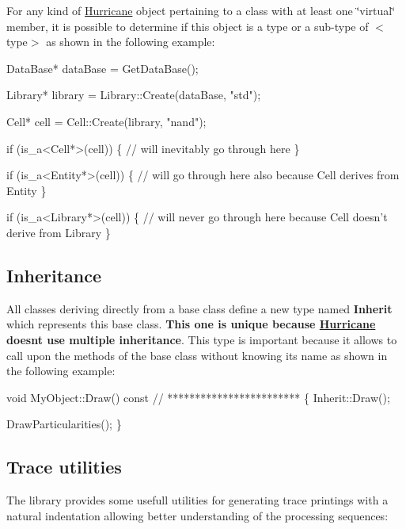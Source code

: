 For any kind of \hyperlink{namespaceHurricane}{Hurricane} object pertaining to a class with at least one \char`\"{}virtual\char`\"{} member, it is possible to determine if this object is a type or a sub-\/type of {\ttfamily $<$type$>$} as shown in the following example\+: 
\begin{DoxyCode}
DataBase* dataBase = GetDataBase();
 
Library* library = Library::Create(dataBase, \textcolor{stringliteral}{"std"});
 
Cell* cell = Cell::Create(library, \textcolor{stringliteral}{"nand"});
 
\textcolor{keywordflow}{if} (is\_a<Cell*>(cell)) \{
   \textcolor{comment}{// will inevitably go through here}
\}
 
\textcolor{keywordflow}{if} (is\_a<Entity*>(cell)) \{
   \textcolor{comment}{// will go through here also because Cell derives from Entity}
\}
 
\textcolor{keywordflow}{if} (is\_a<Library*>(cell)) \{
   \textcolor{comment}{// will never go through here because Cell doesn't derive from Library}
\}
\end{DoxyCode}
\hypertarget{group__Generalities_secGeneralitiesInheritance}{}\subsection{Inheritance}\label{group__Generalities_secGeneralitiesInheritance}
All classes deriving directly from a base class define a new type named {\bfseries Inherit} which represents this base class. {\bfseries This one is unique because \hyperlink{namespaceHurricane}{Hurricane} doesn\textquotesingle{}t use multiple inheritance}. This type is important because it allows to call upon the methods of the base class without knowing its name as shown in the following example\+: 
\begin{DoxyCode}
\textcolor{keywordtype}{void} MyObject::Draw() const
\textcolor{comment}{// ************************}
\{
   Inherit::Draw();
 
   DrawParticularities();
\}
\end{DoxyCode}
\hypertarget{group__Generalities_secGeneralitiesTraceUtilities}{}\subsection{Trace utilities}\label{group__Generalities_secGeneralitiesTraceUtilities}
The library provides some usefull utilities for generating trace printings with a natural indentation allowing better understanding of the processing sequences\+:


